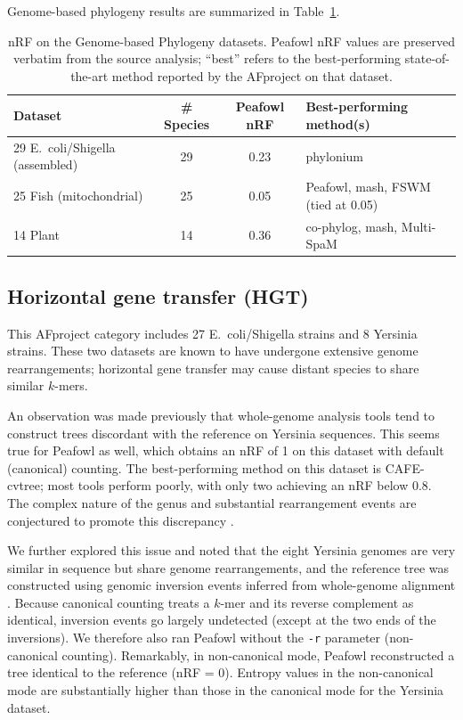 \documentclass[11pt]{article}
\begin{document}
Genome-based phylogeny results are summarized in Table~\ref{tab:genome}.

\begin{table}[t]
\centering
\caption{nRF on the Genome-based Phylogeny datasets. Peafowl nRF values are preserved verbatim from the source analysis; ``best'' refers to the best-performing state-of-the-art method reported by the AFproject on that dataset.}
\label{tab:genome}
\begin{tabular}{lccl}
\toprule
Dataset & \# Species & Peafowl nRF & Best-performing method(s) \\
\midrule
29 E.~coli/Shigella (assembled) & 29 & 0.23 & phylonium \\
25 Fish (mitochondrial)         & 25 & 0.05 & Peafowl, mash, FSWM (tied at 0.05) \\
14 Plant                        & 14 & 0.36 & co-phylog, mash, Multi-SpaM \\
\bottomrule
\end{tabular}
\end{table}

\subsection{Horizontal gene transfer (HGT)}
\label{sec:hgt}

This AFproject category \cite{zielezinski2019afproject} includes 27 E.~coli/Shigella strains and 8 Yersinia strains. These two datasets are known to have undergone extensive genome rearrangements; horizontal gene transfer may cause distant species to share similar $k$-mers.

An observation was made previously \cite{zielezinski2019afproject} that whole-genome analysis tools tend to construct trees discordant with the reference on Yersinia sequences. This seems true for Peafowl as well, which obtains an nRF of 1 on this dataset with default (canonical) counting. The best-performing method on this dataset is CAFE-cvtree; most tools perform poorly, with only two achieving an nRF below 0.8. The complex nature of the genus and substantial rearrangement events are conjectured to promote this discrepancy \cite{zielezinski2019afproject}.

We further explored this issue and noted that the eight Yersinia genomes are very similar in sequence but share genome rearrangements, and the reference tree was constructed using genomic inversion events inferred from whole-genome alignment \cite{chan2014hgt}. Because canonical counting treats a $k$-mer and its reverse complement as identical, inversion events go largely undetected (except at the two ends of the inversions). We therefore also ran Peafowl without the \texttt{-r} parameter (non-canonical counting). Remarkably, in non-canonical mode, Peafowl reconstructed a tree identical to the reference (nRF = 0). Entropy values in the non-canonical mode are substantially higher than those in the canonical mode for the Yersinia dataset.
\end{document}
